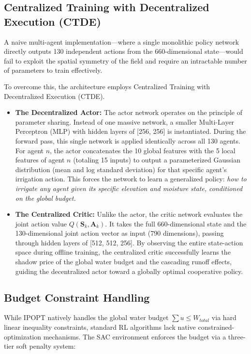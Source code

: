 \documentclass[11pt, a4paper]{article}
\begin{document}
\subsection{Centralized Training with Decentralized Execution (CTDE)}
A naive multi-agent implementation---where a single monolithic policy network directly outputs 130 independent actions from the 660-dimensional state---would fail to exploit the spatial symmetry of the field and require an intractable number of parameters to train effectively. 

To overcome this, the architecture employs Centralized Training with Decentralized Execution (CTDE).

\begin{itemize}
    \item \textbf{The Decentralized Actor:} The actor network operates on the principle of parameter sharing. Instead of one massive network, a smaller Multi-Layer Perceptron (MLP) with hidden layers of [256, 256] is instantiated. During the forward pass, this single network is applied identically across all 130 agents. For agent $n$, the actor concatenates the 10 global features with the 5 local features of agent $n$ (totaling 15 inputs) to output a parameterized Gaussian distribution (mean and log standard deviation) for that specific agent's irrigation action. This forces the network to learn a generalized policy: \textit{how to irrigate any agent given its specific elevation and moisture state, conditioned on the global budget.}
    \item \textbf{The Centralized Critic:} Unlike the actor, the critic network evaluates the joint action value $Q(\mathbf{S}_k, \mathbf{A}_k)$. It takes the full 660-dimensional state and the 130-dimensional joint action vector as input (790 dimensions), passing through hidden layers of [512, 512, 256]. By observing the entire state-action space during offline training, the centralized critic successfully learns the shadow price of the global water budget and the cascading runoff effects, guiding the decentralized actor toward a globally optimal cooperative policy.
\end{itemize}

\subsection{Budget Constraint Handling}

While IPOPT natively handles the global water budget $\sum u \le W_{total}$ via hard linear inequality constraints, standard RL algorithms lack native constrained-optimization mechanisms. The SAC environment enforces the budget via a three-tier soft penalty system:
\end{document}
